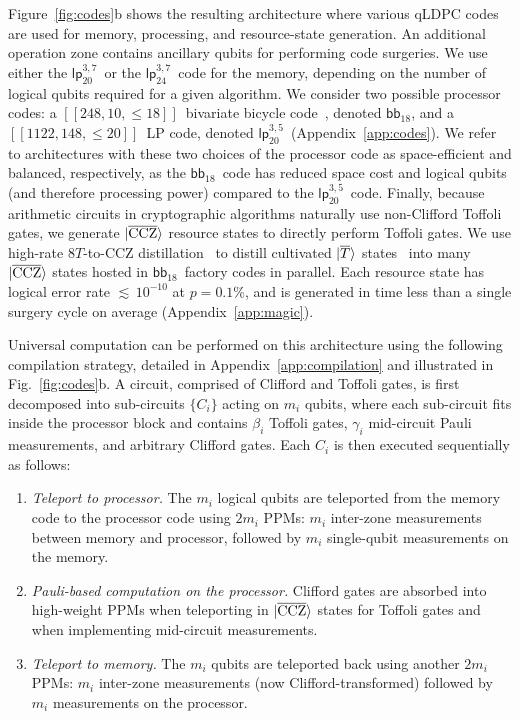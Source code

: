 \documentclass[reprint,twocolumn,secnumarabic,amssymb, aps, prx]{revtex4-2}
\newcommand{\bbparams}{\mbox{$[[248, 10, \leq 18]]$}}
\newcommand{\lpprocparams}{\mbox{$[[1122, 148, \leq 20]]$}}
\newcommand{\bb}{\mbox{$\mathsf{bb}_{18}$}}
\newcommand{\lpmemlarge}{\mbox{$\mathsf{lp}_{24}^{3, 7}$}}
\newcommand{\lpmemmed}{\mbox{$\mathsf{lp}^{3, 7}_{20}$}}
\newcommand{\lpproc}{\mbox{$\mathsf{lp}^{3, 5}_{20}$}}
\newcommand{\lket}[1]{\ket{\overline{#1}}}
\newcommand{\ccz}{\ket{\overline{\text{CCZ}}}}
\begin{document}
Figure~\ref{fig:codes}b shows the resulting architecture where various qLDPC codes are used for memory, processing, and resource-state generation. An additional operation zone contains ancillary qubits for performing code surgeries. We use either the \lpmemmed\ or the \lpmemlarge\ code for the memory, depending on the number of logical qubits required for a given algorithm. We consider two possible processor codes: a \bbparams\ bivariate bicycle code~\cite{liang2025generalized}, denoted \bb, and a \lpprocparams\ LP code, denoted \lpproc\ (Appendix~\ref{app:codes}). We refer to architectures with these two choices of the processor code as space-efficient and balanced, respectively, as the \bb\ code has reduced space cost and logical qubits (and therefore processing power) compared to the \lpproc\ code. Finally, because arithmetic circuits in cryptographic algorithms naturally use non-Clifford Toffoli gates, we generate $\ccz$ resource states to directly perform Toffoli gates. We use high-rate $8T$-to-CCZ distillation~\cite{litinski2019magic, xu2025fast} to distill cultivated $\lket{T}$ states~\cite{gidney2024magic, sahay2025fold} into many $\ccz$ states hosted in \bb\ factory codes in parallel. Each resource state has logical error rate $\lesssim$\,$10^{-10}$ at $p=0.1\%$, and is generated in time less than a single surgery cycle on average (Appendix~\ref{app:magic}). 

Universal computation can be performed on this architecture using the following compilation strategy, detailed in Appendix~\ref{app:compilation} and illustrated in Fig.~\ref{fig:codes}b. A circuit, comprised of Clifford and Toffoli gates, is first decomposed into sub-circuits $\{C_i\}$ acting on $m_i$ qubits, where each sub-circuit fits inside the processor block and contains $\beta_i$ Toffoli gates, $\gamma_i$ mid-circuit Pauli measurements, and arbitrary Clifford gates. Each $C_i$ is then executed sequentially as follows:
\begin{enumerate}
    \item \emph{Teleport to processor.} 
    The $m_i$ logical qubits are teleported from the memory code to the processor code using $2m_i$ PPMs: $m_i$ inter-zone measurements between memory and processor, followed by $m_i$ single-qubit measurements on the memory.
    \item \emph{Pauli-based computation on the processor.} 
    Clifford gates are absorbed into high-weight PPMs when teleporting in $\ccz$ states for Toffoli gates and when implementing mid-circuit measurements. 
    \item \emph{Teleport to memory.} The $m_i$ qubits are teleported back using another $2m_i$ PPMs: $m_i$ inter-zone measurements (now Clifford-transformed) followed by $m_i$ measurements on the processor.
\end{enumerate}
\end{document}
